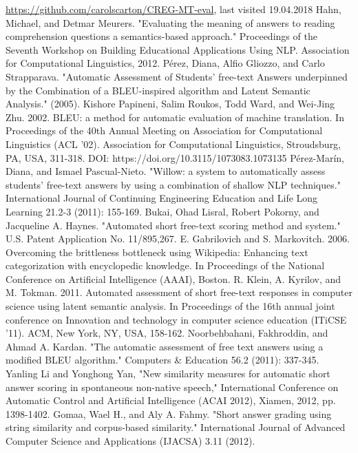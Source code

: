 \documentclass[rnd]{mas_report}
\begin{document}
\begin{thebibliography}{3}
 \url{https://github.com/carolscarton/CREG-MT-eval}, last visited 19.04.2018
 Hahn, Michael, and Detmar Meurers. "Evaluating the meaning of answers to reading comprehension questions a semantics-based approach." Proceedings of the Seventh Workshop on Building Educational Applications Using NLP. Association for Computational Linguistics, 2012.
 Pérez, Diana, Alfio Gliozzo, and Carlo Strapparava. "Automatic Assessment of Students’ free-text Answers underpinned by the Combination of a BLEU-inspired algorithm and Latent Semantic Analysis." (2005).
 Kishore Papineni, Salim Roukos, Todd Ward, and Wei-Jing Zhu. 2002. BLEU: a method for automatic evaluation of machine translation. In Proceedings of the 40th Annual Meeting on Association for Computational Linguistics (ACL '02). Association for Computational Linguistics, Stroudsburg, PA, USA, 311-318. DOI: https://doi.org/10.3115/1073083.1073135
 Pérez-Marín, Diana, and Ismael Pascual-Nieto. "Willow: a system to automatically assess students’ free-text answers by using a combination of shallow NLP techniques." International Journal of Continuing Engineering Education and Life Long Learning 21.2-3 (2011): 155-169.
 Bukai, Ohad Lisral, Robert Pokorny, and Jacqueline A. Haynes. "Automated short free-text scoring method and system." U.S. Patent Application No. 11/895,267.
 E. Gabrilovich and S. Markovitch. 2006. Overcoming the brittleness bottleneck using Wikipedia: Enhancing text categorization with encyclopedic knowledge. In Proceedings of the National Conference on Artificial Intelligence (AAAI), Boston.
 R. Klein, A. Kyrilov, and M. Tokman. 2011. Automated assessment of short free-text responses in computer science using latent semantic analysis. In Proceedings of the 16th annual joint conference on Innovation and technology in computer science education (ITiCSE '11). ACM, New York, NY, USA, 158-162. 
 Noorbehbahani, Fakhroddin, and Ahmad A. Kardan. "The automatic assessment of free text answers using a modified BLEU algorithm." Computers \& Education 56.2 (2011): 337-345.
 Yanling Li and Yonghong Yan, "New similarity measures for automatic short answer scoring in spontaneous non-native speech," International Conference on Automatic Control and Artificial Intelligence (ACAI 2012), Xiamen, 2012, pp. 1398-1402.
 Gomaa, Wael H., and Aly A. Fahmy. "Short answer grading using string similarity and corpus-based similarity." International Journal of Advanced Computer Science and Applications (IJACSA) 3.11 (2012).

\end{thebibliography}
\end{document}
